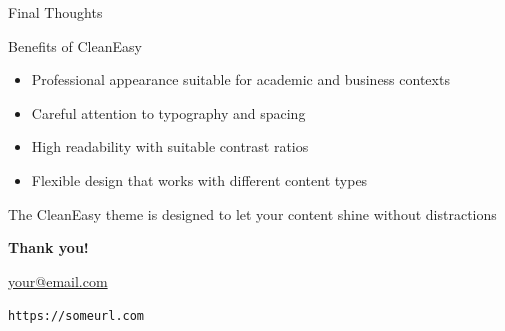 \begin{frame}{Final Thoughts}
  \begin{block}{Benefits of CleanEasy}
    \begin{itemize}
      \item Professional appearance suitable for academic and business contexts
      \item Careful attention to typography and spacing
      \item High readability with suitable contrast ratios
      \item Flexible design that works with different content types
    \end{itemize}
  \end{block}
  
  \vspace{0.5cm}
  
  \begin{center}
    \large{The CleanEasy theme is designed to let your content shine without distractions}
  \end{center}
\end{frame}

\begin{frame}[plain]
  \centering
  \Huge \textbf{Thank you!}
  
  \vspace{1cm}
  \normalsize
  \href{mailto:your@email.com}{your@email.com}
  
  \vspace{0.5cm}
  \small
  \texttt{https://someurl.com}
\end{frame}

    

